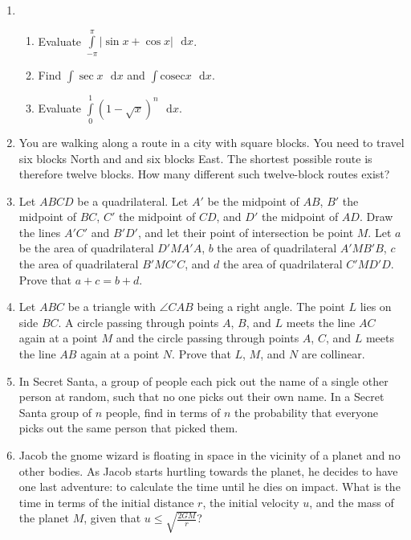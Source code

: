 \documentclass{article}
\begin{document}
\begin{enumerate}
    \item
    \begin{enumerate}
        \item Evaluate $\int \limits_{-\pi}^{\pi} |\sin x + \cos x|\text{ }\mathrm{d}x$.
        \item Find $\int \sec x \text{ }\mathrm{d}x$ and $\int \mathrm{cosec} x \text{ }\mathrm{d}x$.
        \item Evaluate $\int \limits_{0}^{1} (1-\sqrt{x})^n \text{ }\mathrm{d}x$.
    \end{enumerate}
    
    \item
    You are walking along a route in a city with square blocks. You need to travel six blocks North and and six blocks East. The shortest possible route is therefore twelve blocks. How many different such twelve-block routes exist?
    
    \item
    Let $ABCD$ be a quadrilateral. Let $A'$ be the midpoint of $AB$, $B'$ the midpoint of $BC$, $C'$ the midpoint of $CD$, and $D'$ the midpoint of $AD$. Draw the lines $A'C'$ and $B'D'$, and let their point of intersection be point $M$. Let $a$ be the area of quadrilateral $D'MA'A$, $b$ the area of quadrilateral $A'MB'B$, $c$ the area of quadrilateral $B'MC'C$, and $d$ the area of quadrilateral $C'MD'D$. Prove that $a + c =  b + d$.
    
    \item
    Let $ABC$ be a triangle with $\angle CAB$ being a right angle. The point $L$ lies on side $BC$. A circle passing through points $A$, $B$, and $L$ meets the line $AC$ again at a point $M$ and the circle passing through points $A$, $C$, and $L$ meets the line $AB$ again at a point $N$. Prove that $L$, $M$, and $N$ are collinear.
    
    \item
    In Secret Santa, a group of people each pick out the name of a single other person at random, such that no one picks out their own name. In a Secret Santa group of $n$ people, find in terms of $n$ the probability that everyone picks out the same person that picked them.
            
    \item
    Jacob the gnome wizard is floating in space in the vicinity of a planet and no other bodies. As Jacob starts hurtling towards the planet, he decides to have one last adventure: to calculate the time until he dies on impact. What is the time in terms of the initial distance $r$, the initial velocity $u$, and the mass of the planet $M$, given that $u \leq \sqrt{\frac{2GM}{r}}$?
    

\end{enumerate}
\end{document}
